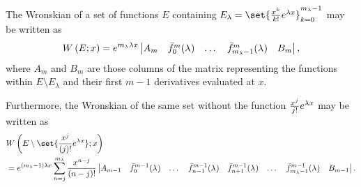 \documentclass{book}
\begin{document}
\newcommand{\Wspec}[2]{\W{ E \setminus \set{\poly{#1} e^{\lambda_{#2} x}}}{x}}
\newcommand{\Detspec}[2]{\begin{vmatrix} \bar{g}_1^{m-1} & \dots & \bar{g}_{m_g}^{m-1} & \fmn{0}{m-1}(\lambda) & \dots & \fmn{#1 - 1}{m-1}(\lambda) & \fmn{#1 + 1}{m-1}(\lambda) & \dots & \fmn{#2}{m-1}(\lambda) \end{vmatrix}}
\newcommand{\Detspectwo}[1]{\begin{vmatrix} A_{m-1} & \fmn{0}{m-1}{} & \dots & \fmn{#1-1}{m-1}{} & \fmn{#1+1}{m-1}{} & \dots & \fmn{m_\lambda-1}{m-1}{} & B_{m-1} \end{vmatrix}}

\newcommand{\eone}{e^{(m_\lambda - 1)\lambda x}}

\begin{lemma} \label{lem:expgroup}
The Wronskian of a set of functions $E$ containing $E_\lambda = \set{\Poly{k} e^{\lambda x}}_{k=0}^{m_\lambda-1}$ may be written as
\begin{equation*}
\W{E}{x} = e^{m_\lambda \lambda x} \begin{vmatrix} A_m & \fmn{0}{m}{} & \dots & \fmn{m_\lambda-1}{m}{} & B_m \end{vmatrix} ,
\end{equation*}
where $A_m$ and $B_m$ are those columns of the matrix representing the functions within $E \setminus E_\lambda$ and their first $m-1$ derivatives evaluated at $x$.

Furthermore, the Wronskian of the same set without the function $\Poly{j} e^{\lambda x}$ may be written as
\begin{align*}
& \Wspec{j}{} \\
& = e^{(m_\lambda - 1) \lambda x} \sum_{n=j}^{m_\lambda} \poly{n-j} \Detspectwo{n} .
\end{align*}
\end{lemma}
\end{document}
